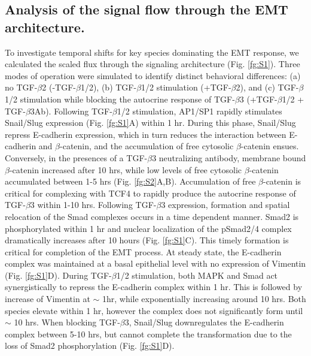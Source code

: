 \subsection*{Analysis of the signal flow through the EMT architecture.}
To investigate temporal shifts for key species dominating the EMT response, we calculated the scaled flux through the signaling architecture (Fig. \ref{fg:S1}).
Three modes of operation were simulated to identify distinct behavioral differences: (a) no TGF-$\beta$2 (-TGF-$\beta$1/2), (b) TGF-$\beta$1/2 stimulation (+TGF-$\beta$2),
and (c) TGF-$\beta$1/2 stimulation while blocking the autocrine response of TGF-$\beta$3 (+TGF-$\beta$1/2 + TGF-$\beta$3Ab).
Following TGF-$\beta$1/2 stimulation, AP1/SP1 rapidly stimulates Snail/Slug expression (Fig. \ref{fg:S1}A) within 1 hr.
During this phase, Snail/Slug repress E-cadherin expression, which in turn reduces the interaction between E-cadherin and $\beta$-catenin, and the accumulation of free cytosolic $\beta$-catenin ensues.
Conversely, in the presences of a TGF-$\beta$3 neutralizing antibody, membrane bound $\beta$-catenin increased after 10 hrs,
while low levels of free cytosolic $\beta$-catenin accumulated between 1-5 hrs (Fig. \ref{fg:S2}A,B).  Accumulation of free $\beta$-catenin is critical for complexing with TCF4 to rapidly produce the autocrine response of TGF-$\beta$3 within 1-10 hrs.  Following TGF-$\beta$3 expression, formation and spatial relocation of the Smad complexes occurs in a time dependent manner.  Smad2 is phosphorylated within 1 hr and nuclear localization of the pSmad2/4 complex dramatically increases after 10 hours (Fig. \ref{fg:S1}C).  This timely formation is critical for completion of the EMT process.  At steady state, the E-cadherin complex was maintained at a basal epithelial level with no expression of Vimentin (Fig. \ref{fg:S1}D). During TGF-$\beta$1/2 stimulation, both MAPK and Smad act synergistically to repress the E-cadherin complex within 1 hr.
This is followed by increase of Vimentin at $\sim$ 1hr, while exponentially increasing around 10 hrs.
Both species elevate within 1 hr, however the complex does not significantly form until $\sim$ 10 hrs.
When blocking TGF-$\beta$3, Snail/Slug downregulates the E-cadherin complex between 5-10 hrs,
but cannot complete the transformation due to the loss of Smad2 phosphorylation (Fig. \ref{fg:S1}D).

